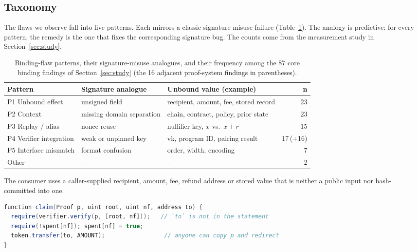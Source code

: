\subsection{Taxonomy}\label{sec:def-taxonomy}

The flaws we observe fall into five patterns. Each mirrors a classic
signature-misuse failure (Table~\ref{tab:taxonomy}). The analogy is
predictive: for every pattern, the remedy is the one that fixes the
corresponding signature bug. The counts come from the measurement study in
Section~\ref{sec:study}.

\begin{table}[t]
\centering
\caption{Binding-flaw patterns, their signature-misuse analogues, and their
frequency among the 87 core binding findings of Section~\ref{sec:study}
(the 16 adjacent proof-system findings in parentheses).}
\label{tab:taxonomy}
\footnotesize
\setlength{\tabcolsep}{3pt}
\begin{tabular}{@{}p{2.0cm}p{1.75cm}p{2.45cm}r@{}}
\toprule
\textbf{Pattern} & \textbf{Signature analogue} & \textbf{Unbound value (example)} & \textbf{n} \\
\midrule
P1 Unbound effect & unsigned field & recipient, amount, fee, stored record & 23 \\
P2 Context & missing domain separation & chain, contract, policy, prior state & 23 \\
P3 Replay / alias & nonce reuse & nullifier key, $x$ vs.\ $x{+}r$ & 15 \\
P4 Verifier integration & weak or unpinned key & vk, program ID, pairing result & 17\,(+16) \\
P5 Interface mismatch & format confusion & order, width, encoding & 7 \\
Other & -- & -- & 2 \\
\bottomrule
\end{tabular}
\end{table}

The consumer uses a caller-supplied recipient, amount, fee, refund address or
stored value that is neither a public input nor hash-committed into one.
\begin{lstlisting}[language=Java]
function claim(Proof p, uint root, uint nf, address to) {
  require(verifier.verify(p, [root, nf]));   // `to` is not in the statement
  require(!spent[nf]); spent[nf] = true;
  token.transfer(to, AMOUNT);                 // anyone can copy p and redirect
}
\end{lstlisting}

